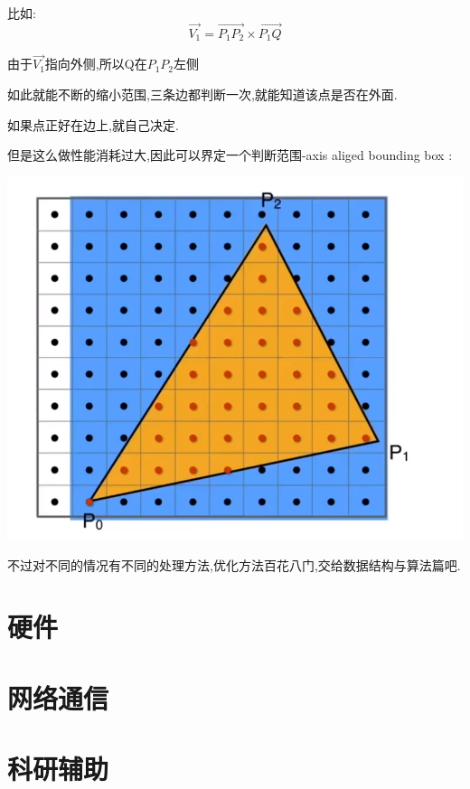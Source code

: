 \documentclass[UTF8,12pt]{ctexbook}
\begin{document}
{{{{{        比如:
        $$
          \vec{V_1} = \vec{P_1P_2} \times \vec{P_1Q}
        $$

        由于$\vec{V_1}$指向外侧,所以Q在$P_1P_2$左侧

        如此就能不断的缩小范围,三条边都判断一次,就能知道该点是否在外面.

        如果点正好在边上,就自己决定.

        但是这么做性能消耗过大,因此可以界定一个判断范围-axis aliged bounding box :

        \begin{center}
          \includegraphics[scale = 0.5]{resources/pixel_boundingBox.png}
        \end{center}

        不过对不同的情况有不同的处理方法,优化方法百花八门,交给数据结构与算法篇吧.
      }%

    }%

   }%

  \section{硬件}{

   }%

  \section{网络通信}{

   }%

  \section{科研辅助}{

}}}
\end{document}
